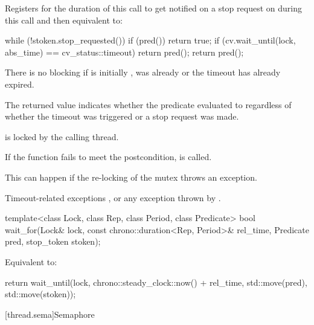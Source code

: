 \begin{itemdescr}
\pnum
\effects
Registers for the duration of this call 
to get notified on a stop request on 
during this call and then equivalent to:
\begin{codeblock}
while (!stoken.stop_requested()) {
  if (pred())
    return true;
  if (cv.wait_until(lock, abs_time) == cv_status::timeout)
    return pred();
}
return pred();
\end{codeblock}

\pnum
\begin{note}
There is no blocking if  is initially ,
 was already 
or the timeout has already expired.
\end{note}

\pnum
\begin{note}
The returned value indicates whether the predicate evaluated to 
regardless of whether the timeout was triggered or a stop request was made.
\end{note}

\pnum
\ensures {} is locked by the calling thread.

\pnum
\remarks
If the function fails to meet the postcondition,
 is called.
\begin{note}
This can happen if the re-locking of the mutex throws an exception.
\end{note}

\pnum
\throws
Timeout-related exceptions ,
or any exception thrown by .
\end{itemdescr}

\begin{itemdecl}
template<class Lock, class Rep, class Period, class Predicate>
  bool wait_for(Lock& lock, const chrono::duration<Rep, Period>& rel_time,
                Predicate pred, stop_token stoken);
\end{itemdecl}

\begin{itemdescr}
\pnum
\effects Equivalent to:
\begin{codeblock}
return wait_until(lock, chrono::steady_clock::now() + rel_time, std::move(pred),
                  std::move(stoken));
\end{codeblock}
\end{itemdescr}

[thread.sema]{Semaphore}

